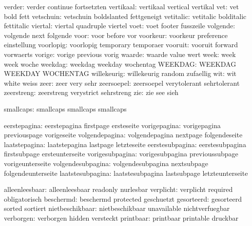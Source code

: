              verder:  verder               continue            fortsetzten
          vertikaal:  vertikaal            vertical            vertikal
                vet:  vet                  bold                fett
          vetschuin:  vetschuin            boldslanted         fettgeneigt
          vetitalic:  vetitalic            bolditalic          fettitalic
            viertal:  viertal              quadruple           viertel
               voet:  voet                 footer              fusszeile
           volgende:  volgende             next                folgende
               voor:  voor                 before              vor
           voorkeur:  voorkeur             preference          einstellung
          voorlopig:  voorlopig            temporary           temporaer
            vooruit:  vooruit              forward             vorwaerts
             vorige:  vorige               previous            vorig
             waarde:  waarde               value               wert
               week:  week                 week                woche
            weekdag:  weekdag              weekday             wochentag
            WEEKDAG:  WEEKDAG              WEEKDAY             WOCHENTAG
        willekeurig:  willekeurig          random              zufaellig
                wit:  wit                  white               weiss
               zeer:  zeer                 very                sehr
         zeersoepel:  zeersoepel           verytolerant        sehrtolerant
         zeerstreng:  zeerstreng           verystrict          sehrstreng
                zie:  zie                  see                 sieh

          smallcaps:  smallcaps            smallcaps           smallcaps 

       eerstepagina:  eerstepagina         firstpage           ersteseite
       vorigepagina:  vorigepagina         previouspage        vorigeseite
     volgendepagina:  volgendepagina       nextpage            folgendeseite
      laatstepagina:  laatstepagina        lastpage            letzteseite
    eerstesubpagina:  eerstesubpagina      firstsubpage        ersteunterseite
    vorigesubpagina:  vorigesubpagina      previoussubpage     vorigeunterseite
  volgendesubpagina:  volgendesubpagina    nextsubpage         folgendeunterseite
   laatstesubpagina:  laatstesubpagina     lastsubpage         letzteunterseite

     alleenleesbaar:  alleenleesbaar       readonly            nurlesbar
          verplicht:  verplicht            required            obligatorisch
          beschermd:  beschermd            protected           geschuetzt
         gesorteerd:  gesorteerd           sorted              sortiert
    nietbeschikbaar:  nietbeschikbaar      unavailable         nichtverfuegbar
          verborgen:  verborgen            hidden              versteckt
          printbaar:  printbaar            printable           druckbar
 
